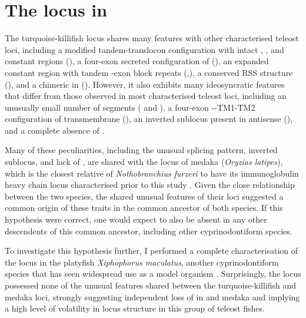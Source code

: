 \section{The \igh{} locus in \xma}
\label{sec:xma-locus}
	
	The turquoise-killifish \igh{} locus shares many features with other characterised teleost loci, including a modified tandem-translocon configuration with intact \vh, \dh, \jh and constant regions (), a four-exon secreted configuration of  (), an expanded  constant region with tandem \cd{}-exon block repeats (,), a conserved RSS structure (), and a chimeric  in  (). However, it also exhibits many ideosyncratic features that differ from those observed in most characterised teleost loci, including an unusually small number of \vh segments ( and ), a four-exon --TM1-TM2 configuration of transmembrane  (), an inverted sublocus present in antisense (), and a complete absence of .
	
Many of these peculiarities, including the unusual  splicing pattern, inverted sublocus, and lack of , are shared with the \igh{} locus of medaka (\textit{Oryzias latipes}), which is the closest relative of \textit{Nothobranchius furzeri} to have its immunoglobulin heavy chain locus characterised prior to this study \parencite{magadan2011medaka}. Given the close relationship between the two species, the shared unusual features of their \igh{} loci suggested a common origin of these traits  in the common ancestor of both species. If this hypothesis were correct, one would expect  to also be absent in any other descendents of this common ancestor, including other cyprinodontiform species.

To investigate this hypothesis further, I performed a complete characterisation of the \igh{} locus in the platyfish \textit{Xiphophorus maculatus}, another cyprinodontiform species that has seen widespread use as a model organism \parencite{schartl2013platyfish}. Surprisingly, the \Xma locus possessed none of the unusual features shared between the turquoise-killifish and medaka loci, strongly suggesting independent loss of  in \Nfu and medaka and implying a high level of volatility in \igh{} locus structure in this group of teleost fishes.

